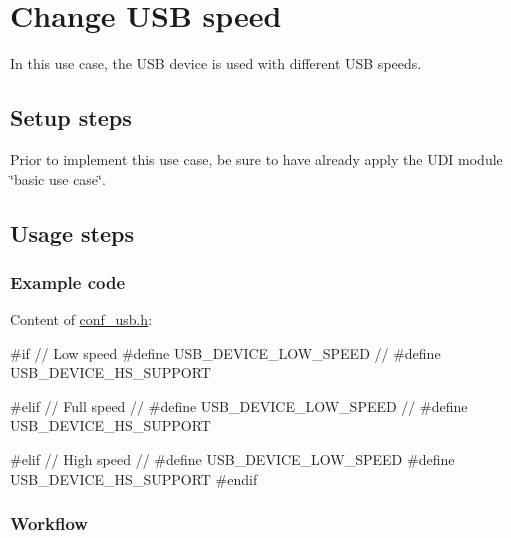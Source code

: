\begin{DoxyEnumerate}
\begin{DoxyItemize}
\end{DoxyItemize}
\end{DoxyEnumerate}\hypertarget{udc_use_case_1}{}\section{Change U\-S\-B speed}\label{udc_use_case_1}
In this use case, the U\-S\-B device is used with different U\-S\-B speeds.\hypertarget{udc_use_case_1_udc_use_case_1_setup}{}\subsection{Setup steps}\label{udc_use_case_1_udc_use_case_1_setup}
Prior to implement this use case, be sure to have already apply the U\-D\-I module \char`\"{}basic use case\char`\"{}.\hypertarget{udc_use_case_1_udc_use_case_1_usage}{}\subsection{Usage steps}\label{udc_use_case_1_udc_use_case_1_usage}
\hypertarget{udc_use_case_1_udc_use_case_1_usage_code}{}\subsubsection{Example code}\label{udc_use_case_1_udc_use_case_1_usage_code}
Content of \hyperlink{conf__usb_8h}{conf\-\_\-usb.\-h}\-: 
\begin{DoxyCode}
\textcolor{preprocessor}{         #if // Low speed}
\textcolor{preprocessor}{}\textcolor{preprocessor}{         #define USB\_DEVICE\_LOW\_SPEED}
\textcolor{preprocessor}{}         \textcolor{comment}{// #define USB\_DEVICE\_HS\_SUPPORT}

\textcolor{preprocessor}{         #elif // Full speed}
\textcolor{preprocessor}{}         \textcolor{comment}{// #define USB\_DEVICE\_LOW\_SPEED}
         \textcolor{comment}{// #define USB\_DEVICE\_HS\_SUPPORT}

\textcolor{preprocessor}{         #elif // High speed}
\textcolor{preprocessor}{}         \textcolor{comment}{// #define USB\_DEVICE\_LOW\_SPEED}
\textcolor{preprocessor}{         #define USB\_DEVICE\_HS\_SUPPORT}
\textcolor{preprocessor}{}
\textcolor{preprocessor}{         #endif}
\end{DoxyCode}
\hypertarget{udc_use_case_1_udc_use_case_1_usage_flow}{}\subsubsection{Workflow}\label{udc_use_case_1_udc_use_case_1_usage_flow}

